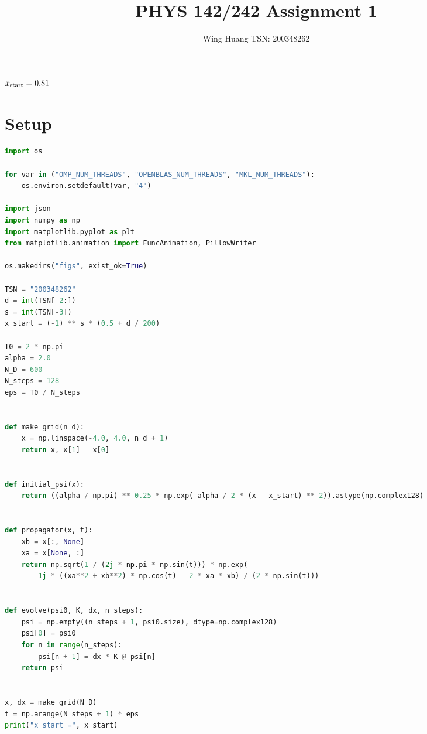 \documentclass[11pt]{article}
\title{PHYS 142/242 Assignment 1}
\author{Wing Huang \quad TSN: 200348262}
\date{}
\begin{document}
\maketitle

\begin{center}
  \Large $x_{\rm start} = 0.81$
\end{center}

\section*{Setup}
\begin{lstlisting}[language=Python]
import os

for var in ("OMP_NUM_THREADS", "OPENBLAS_NUM_THREADS", "MKL_NUM_THREADS"):
    os.environ.setdefault(var, "4")

import json
import numpy as np
import matplotlib.pyplot as plt
from matplotlib.animation import FuncAnimation, PillowWriter

os.makedirs("figs", exist_ok=True)

TSN = "200348262"
d = int(TSN[-2:])
s = int(TSN[-3])
x_start = (-1) ** s * (0.5 + d / 200)

T0 = 2 * np.pi
alpha = 2.0
N_D = 600
N_steps = 128
eps = T0 / N_steps


def make_grid(n_d):
    x = np.linspace(-4.0, 4.0, n_d + 1)
    return x, x[1] - x[0]


def initial_psi(x):
    return ((alpha / np.pi) ** 0.25 * np.exp(-alpha / 2 * (x - x_start) ** 2)).astype(np.complex128)


def propagator(x, t):
    xb = x[:, None]
    xa = x[None, :]
    return np.sqrt(1 / (2j * np.pi * np.sin(t))) * np.exp(
        1j * ((xa**2 + xb**2) * np.cos(t) - 2 * xa * xb) / (2 * np.sin(t)))


def evolve(psi0, K, dx, n_steps):
    psi = np.empty((n_steps + 1, psi0.size), dtype=np.complex128)
    psi[0] = psi0
    for n in range(n_steps):
        psi[n + 1] = dx * K @ psi[n]
    return psi


x, dx = make_grid(N_D)
t = np.arange(N_steps + 1) * eps
print("x_start =", x_start)
\end{lstlisting}
\end{document}

